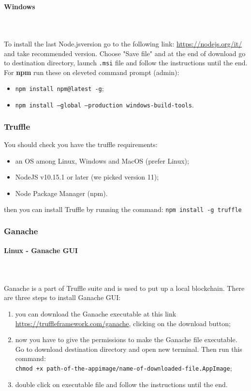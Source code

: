 \paragraph{Windows} \mbox{} \\ \mbox{} \\
To install the last Node.js\glosp version go to the following link: \url{https://nodejs.org/it/} and take recommended version.
Choose "Save file" and at the end of download go to destination directory, launch \texttt{.msi} file and follow the instructions until the end.
For \textbf{npm} run these on eleveted command prompt (admin):
\begin{itemize}
	\item \texttt{npm install npm@latest -g};
	\item \texttt{npm install ---global ---production windows-build-tools}.
\end{itemize}

\subsubsection{Truffle}
You should check you have the truffle requirements:
\begin{itemize}
	\item an OS among Linux, Windows and MacOS (prefer Linux);
	\item NodeJS v10.15.1 or later (we picked version 11);
	\item Node Package Manager (npm\glo).
\end{itemize}
then you can install Truffle by running the command: \texttt{npm install -g truffle}


\subsubsection{Ganache}
\paragraph{Linux - Ganache GUI} \mbox{} \\ \mbox{} \\
Ganache is a part of Truffle suite and is used to put up a local blockchain.
There are three steps to install Ganache GUI:
\begin{enumerate}
	\item you can download the Ganache executable at this link \url{https://truffleframework.com/ganache}, clicking on the download button;
	\item now you have to give the permissions to make the Ganache file executable. Go to download destination directory and open new terminal. Then run this command: \\\texttt{chmod +x path-of-the-appimage/name-of-downloaded-file.AppImage};
	\item double click on executable file and follow the instructions until the end.
\end{enumerate}
